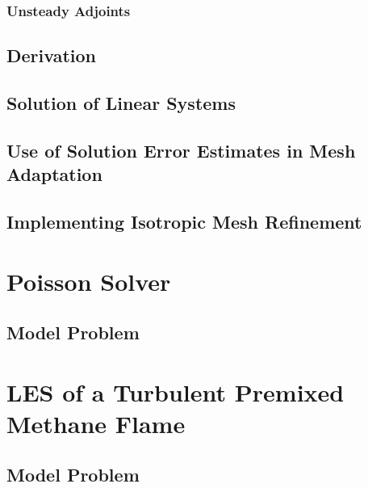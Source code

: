 \documentclass[titlepage,11pt,letterpaper]{article}
\begin{document}
\subsubsection{Unsteady Adjoints}
\subsection{Derivation}
\subsection{Solution of Linear Systems}
\subsection{Use of Solution Error Estimates in Mesh Adaptation}
\subsection{Implementing Isotropic Mesh Refinement}


\newpage
\section{Poisson Solver}
\subsection{Model Problem}


\newpage
\section{LES of a Turbulent Premixed Methane Flame}
\subsection{Model Problem}
\end{document}
